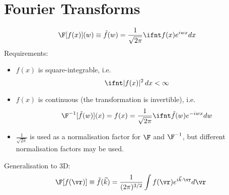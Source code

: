 \documentclass[cplx.tex]{subfiles}
\begin{document}
\section{Fourier Transforms}
\begin{align}
    \F[f(x)](w) \equiv \tilde{f}(w) &= \frac{1}{\sqrt{2\pi}} \ifnt f(x)e^{iwx}dx
\end{align}
Requirements:
\begin{itemize}
    \item $f(x)$ is square-integrable, i.e.
        \begin{equation}
            \ifnt |f(x)|^2\,dx < \infty
        \end{equation}
    \item $f(x)$ is continuous (the transformation is invertible), i.e.
        \begin{equation}
            \F^{-1}[\tilde{f}(w)](x) = f(x) = \frac{1}{\sqrt{2\pi}} \ifnt \tilde{f}(w)e^{-iwx}dw
        \end{equation}
    \item $\frac{1}{\sqrt{2\pi}}$ is used as a normalisation factor for $\F$ and $\F^{-1}$, but different normalisation factors may be used. 
\end{itemize}
Generalisation to 3D:
\begin{equation}
    \F[f(\vr)] \equiv \tilde{f}(\vec{k}) = \frac{1}{(2\pi)^{3/2}} \int f(\vr)e^{i\vec{k}\cdot\vr} d\vr
\end{equation}
\end{document}
